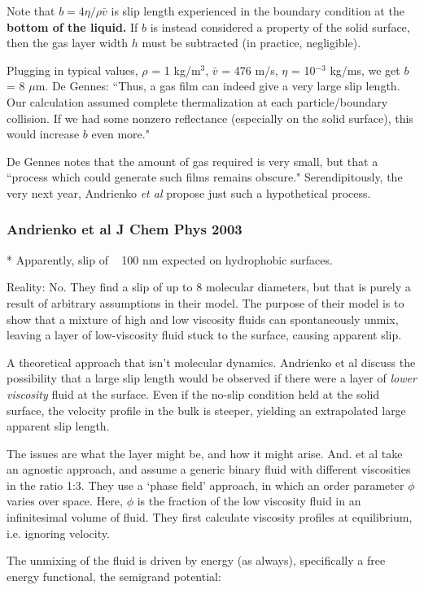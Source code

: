 \documentclass[twocolumn]{article}
\begin{document}
Note that $b=4\eta/\rho \bar{v}$ is slip length experienced in the boundary condition at the \textbf{bottom of the liquid.}  If $b$ is instead considered a property of the solid surface, then the gas layer width $h$ must be subtracted (in practice, negligible).

Plugging in typical values, $\rho$ = 1 kg/m$^{3}$, $\bar{v}$ = 476 m/s, $\eta$ = 10$^{-3}$ kg/ms, we get $b$ = 8 $\mu$m. De Gennes: ``Thus, a gas film can indeed give a very large slip length.  Our calculation assumed complete thermalization at each particle/boundary collision.  If we had some nonzero reflectance (especially on the solid surface), this would increase $b$ even more."

De Gennes notes that the amount of gas required is very small, but that a ``process which could generate such films remains obscure."  Serendipitously, the very next year, Andrienko \emph{et al} propose just such a hypothetical process.

\subsubsection*{Andrienko et al J Chem Phys 2003}
* Apparently, slip of ~ 100 nm expected on hydrophobic surfaces.

Reality: No. They find a slip of up to 8 molecular diameters, but that is purely a result of arbitrary assumptions in their model. The purpose of their model is to show that a mixture of high and low viscosity fluids can spontaneously unmix, leaving a layer of low-viscosity fluid stuck to the surface, causing apparent slip. 

A theoretical approach that isn't molecular dynamics. Andrienko et al discuss the possibility that a large slip length would be observed if there were a layer of \emph{lower viscosity} fluid at the surface.  Even if the no-slip condition held at the solid surface, the velocity profile in the bulk is steeper, yielding an extrapolated large apparent slip length. 

The issues are what the layer might be, and how it might arise. And. et al take an agnostic approach, and assume a generic binary fluid with different viscosities in the ratio 1:3.  They use a `phase field' approach, in which an order parameter $\phi$ varies over space. Here, $\phi$ is the fraction of the low viscosity fluid in an infinitesimal volume of fluid. They first calculate viscosity profiles at equilibrium, i.e. ignoring velocity.

The unmixing of the fluid is driven by energy (as always), specifically a free energy functional, the semigrand potential:
\end{document}
